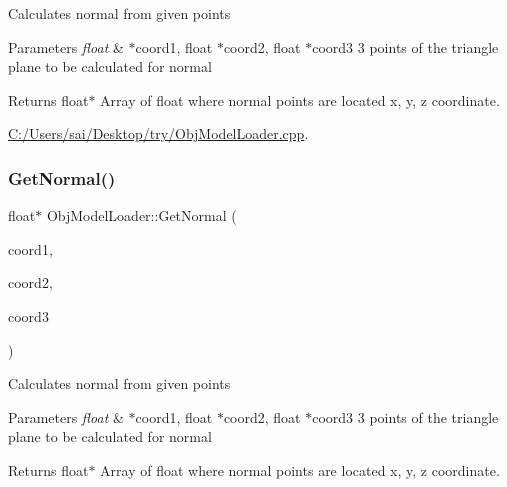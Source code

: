 Calculates normal from given points


\begin{DoxyParams}{Parameters}
{\em float} & $\ast$coord1, float $\ast$coord2, float $\ast$coord3 3 points of the triangle plane to be calculated for normal\\
\hline
\end{DoxyParams}
\begin{DoxyReturn}{Returns}
float$\ast$ Array of float where normal points are located x, y, z coordinate. 
\end{DoxyReturn}
\begin{Desc}
\item[Examples\+: ]\par
\mbox{\hyperlink{_c_1_2_users_2sai_2_desktop_2try_2_obj_model_loader_8cpp-example}{C\+:/\+Users/sai/\+Desktop/try/\+Obj\+Model\+Loader.\+cpp}}.\end{Desc}
\mbox{\label{class_obj_model_loader_ab7e5baa8ba27e56f828e1591f199f41b}} 
\subsubsection{\texorpdfstring{Get\+Normal()}{GetNormal()}\hspace{0.1cm}{\footnotesize\ttfamily [2/3]}}
{\footnotesize\ttfamily float$\ast$ Obj\+Model\+Loader\+::\+Get\+Normal (\begin{DoxyParamCaption}\item[{float $\ast$}]{coord1,  }\item[{float $\ast$}]{coord2,  }\item[{float $\ast$}]{coord3 }\end{DoxyParamCaption})\hspace{0.3cm}{\ttfamily [private]}}

Calculates normal from given points


\begin{DoxyParams}{Parameters}
{\em float} & $\ast$coord1, float $\ast$coord2, float $\ast$coord3 3 points of the triangle plane to be calculated for normal\\
\hline
\end{DoxyParams}
\begin{DoxyReturn}{Returns}
float$\ast$ Array of float where normal points are located x, y, z coordinate. 
\end{DoxyReturn}
\mbox{\label{class_obj_model_loader_ab7e5baa8ba27e56f828e1591f199f41b}} 
